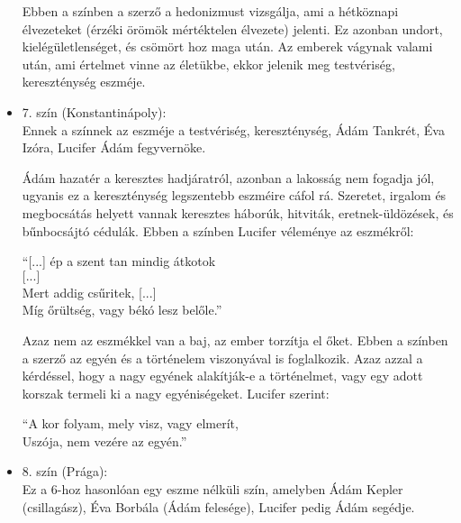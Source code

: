 \documentclass[]{article}
\begin{document}
\begin{itemize}
	 		Ebben a színben a szerző a hedonizmust vizsgálja, ami a hétköznapi élvezeteket (érzéki örömök mértéktelen élvezete) jelenti. Ez azonban undort, kielégületlenséget, és csömört hoz maga után. Az emberek vágynak valami után, ami értelmet vinne az életükbe, ekkor jelenik meg testvériség, kereszténység eszméje.
 		\item 7. szín (Konstantinápoly):\\
 			Ennek a színnek az eszméje a testvériség, kereszténység, Ádám Tankrét, Éva Izóra, Lucifer Ádám fegyvernöke.
 			
 			Ádám hazatér a keresztes hadjáratról, azonban a lakosság nem fogadja jól, ugyanis ez a kereszténység legszentebb eszméire cáfol rá. Szeretet, irgalom és megbocsátás helyett vannak keresztes háborúk, hitviták, eretnek-üldözések, és bűnbocsájtó cédulák. Ebben a színben Lucifer véleménye az eszmékről:
 			\begin{displayquote}
 				\enquote{[...] ép a szent tan mindig átkotok\\
 				$\textrm{[...]}$\\
 				Mert addig csűritek, [...]\\
 				Míg őrültség, vagy békó lesz belőle.}
 			\end{displayquote}
 			Azaz nem az eszmékkel van a baj, az ember torzítja el őket. Ebben a színben a szerző az egyén és a történelem viszonyával is foglalkozik. Azaz azzal a kérdéssel, hogy a nagy egyének alakítják-e a történelmet, vagy egy adott korszak termeli ki a nagy egyéniségeket. Lucifer szerint:
 			\begin{displayquote}
 				\enquote{A kor folyam, mely visz, vagy elmerít,\\
 				Uszója, nem vezére az egyén.}
 			\end{displayquote}
 		\item 8. szín (Prága):\\
 			Ez a 6-hoz hasonlóan egy eszme nélküli szín, amelyben Ádám Kepler (csillagász), Éva Borbála (Ádám felesége), Lucifer pedig Ádám segédje.
 			

\end{itemize}
\end{document}
